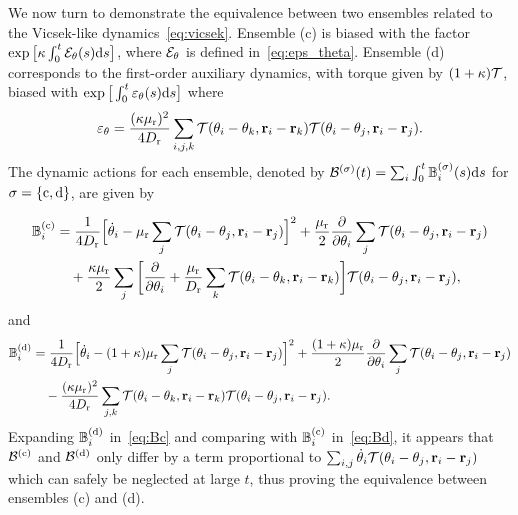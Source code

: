\documentclass[superscriptaddress, twocolumn, prx, longbibliography, nofootinbib]{revtex4-1}
\begin{document}
We now turn to demonstrate the equivalence between two ensembles related to the Vicsek-like dynamics~\eqref{eq:vicsek}. Ensemble (c) is biased with the factor $\exp\big[\kappa\int_0^t{\cal E}_\theta(s){\rm d}s\big]$, where ${\cal E}_\theta$ is defined in~\eqref{eq:eps_theta}. Ensemble (d) corresponds to the first-order auxiliary dynamics, with torque given by $(1+\kappa){\cal T}$, biased with $\exp\big[\int_0^t\varepsilon_\theta(s){\rm d}s\big]$ where
\begin{equation}
	 \varepsilon_\theta = \frac{(\kappa\mu_{\rm r})^2}{4D_{\rm r}} \sum_{i,j,k} {\cal T}(\theta_i-\theta_k,{\bf r}_i-{\bf r}_k) {\cal T}(\theta_i-\theta_j,{\bf r}_i-{\bf r}_j) .
\end{equation}
The dynamic actions for each ensemble, denoted by ${\cal B}^{( \sigma)}(t) = \sum_i\int_0^t{\mathbb B}_i^{(\sigma)}(s){\rm d}s$ for $\sigma=\{{\rm c,d}\}$, are given by
\begin{widetext}
\begin{equation}\label{eq:Bc}
	\begin{aligned}
		{\mathbb B}_i^{(\rm c)} &= \frac{1}{4D_{\rm r}} \Big[ \dot\theta_i - \mu_{\rm r}\sum_j{\cal T}(\theta_i-\theta_j,{\bf r}_i-{\bf r}_j) \Big]^2 + \frac{\mu_{\rm r}}{2} \frac{\partial}{\partial\theta_i}\sum_j{\cal T}(\theta_i-\theta_j,{\bf r}_i-{\bf r}_j)
		\\
		&\quad + \frac{\kappa\mu_{\rm r}}{2} \sum_j \bigg[ \frac{\partial}{\partial\theta_i} + \frac{\mu_{\rm r}}{D_{\rm r}}\sum_k{\cal T}(\theta_i-\theta_k,{\bf r}_i-{\bf r}_k) \bigg] {\cal T}(\theta_i-\theta_j,{\bf r}_i-{\bf r}_j) ,
	\end{aligned}
\end{equation}
and
\begin{equation}\label{eq:Bd}
	\begin{aligned}
		{\mathbb B}_i^{(\rm d)} &= \frac{1}{4D_{\rm r}} \Big[ \dot\theta_i - (1+\kappa)\mu_{\rm r}\sum_j{\cal T}(\theta_i-\theta_j,{\bf r}_i-{\bf r}_j) \Big]^2 + \frac{(1+\kappa)\mu_{\rm r}}{2} \frac{\partial}{\partial\theta_i}\sum_j{\cal T}(\theta_i-\theta_j,{\bf r}_i-{\bf r}_j)
		\\
		&\quad - \frac{(\kappa\mu_{\rm r}	)^2}{4D_{\rm r}} \sum_{j,k} {\cal T}(\theta_i-\theta_k,{\bf r}_i-{\bf r}_k) {\cal T}(\theta_i-\theta_j,{\bf r}_i-{\bf r}_j) .
	\end{aligned}
\end{equation}
Expanding ${\mathbb B}_i^{(\rm d)}$ in~\eqref{eq:Bc} and comparing with ${\mathbb B}_i^{(\rm c)}$ in~\eqref{eq:Bd}, it appears that ${\cal B}^{(\rm c)}$ and ${\cal B}^{(\rm d)}$ only differ by a term proportional to $\sum_{i,j} \dot\theta_i {\cal T}(\theta_i-\theta_j,{\bf r}_i-{\bf r}_j)$ which can safely be neglected at large $t$, thus proving the equivalence between ensembles (c) and (d).
\end{widetext}




%

\end{document}
